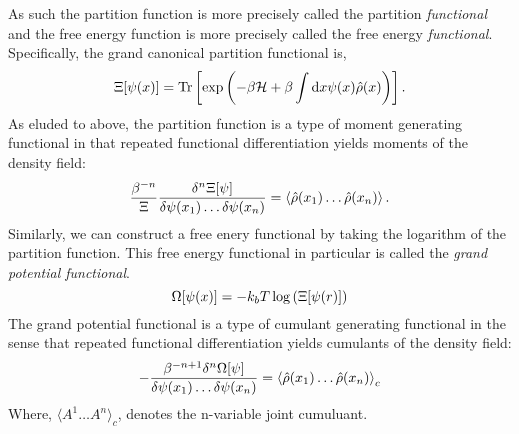As such the partition function is more precisely called the partition
\textit{functional} and the free energy function is more precisely called the
free energy \textit{functional}.  Specifically, the grand canonical partition
functional is,
%
\begin{equation}
    \Xi[\psi(x)] = \mathrm{Tr}\left[ \exp\left(-\beta\mathcal{H} +\beta\int\mathrm{d}x
        \psi(x) \hat{\rho}(x)\right) \right].
\end{equation}
%
As eluded to above, the partition function is a type of moment generating
functional in that repeated functional differentiation yields moments of the
density field:
%
\begin{equation}
    \frac{\beta^{-n}}{\Xi} \frac{\delta^n \Xi[\psi]}{\delta \psi(x_1) \dots \delta\psi(x_n)} 
        = \left\langle \hat{\rho}(x_1)\dots\hat{\rho}(x_n) \right\rangle.
\end{equation}
%
Similarly, we can construct a free enery functional by taking the logarithm of
the partition function. This free energy functional in particular is called the
\textit{grand potential functional}.
%
\begin{equation}
    \Omega[\psi(x)] = -k_bT\log\left(\Xi[\psi(r)]\right)
\end{equation}
%
The grand potential functional is a type of cumulant generating functional in
the sense that repeated functional differentiation yields cumulants of the
density field:
%
\begin{equation}
    -\frac{\beta^{-n + 1}\delta^n\Omega[\psi]}{\delta\psi(x_1)\dots\delta\psi(x_n)}
        = \left\langle \hat{\rho}(x_1)\dots\hat{\rho}(x_n) \right\rangle_c
\end{equation}
%
Where, $\langle A^1\dots A^n \rangle_c$, denotes the n-variable joint
cumuluant.

